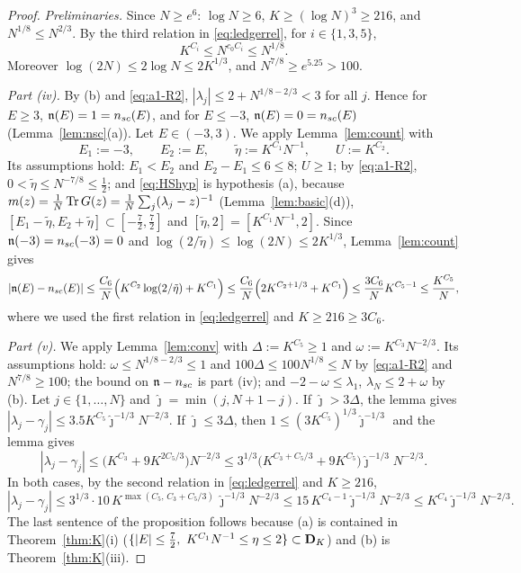 \begin{proof}
\emph{Preliminaries.} Since $N\ge e^6$: $\log N\ge6$, $K\ge(\log N)^3\ge216$, and $N^{1/8}\le N^{2/3}$. By the third relation in \eqref{eq:ledgerrel}, for $i\in\{1,3,5\}$,
\begin{equation}\tag{R2}\label{eq:a1-R2}
 K^{C_i}\le N^{c_0C_i}\le N^{1/8} .
\end{equation}
Moreover $\log(2N)\le2\log N\le2K^{1/3}$, and $N^{7/8}\ge e^{5.25}>100$.

\emph{Part \textup{(iv)}.} By (b) and \eqref{eq:a1-R2}, $|\lambda_j|\le2+N^{1/8-2/3}<3$ for all $j$. Hence for $E\ge3$, $\mathfrak{n}(E)=1=n_{sc}(E)$, and for $E\le-3$, $\mathfrak{n}(E)=0=n_{sc}(E)$ (Lemma~\ref{lem:nsc}(a)).
Let $E\in(-3,3)$. We apply Lemma~\ref{lem:count} with
\[
 E_1:=-3,\qquad E_2:=E,\qquad\tilde\eta:=K^{C_1}N^{-1},\qquad U:=K^{C_2}.
\]
Its assumptions hold: $E_1<E_2$ and $E_2-E_1\le6\le8$; $U\ge1$; by \eqref{eq:a1-R2}, $0<\tilde\eta\le N^{-7/8}\le\frac12$; and \eqref{eq:HShyp} is hypothesis (a), because $m(z)=\frac1N\operatorname{Tr} G(z)=\frac1N\sum_j(\lambda_j-z)^{-1}$ (Lemma~\ref{lem:basic}(d)),
$[E_1-\tilde\eta,E_2+\tilde\eta]\subset[-\frac72,\frac72]$ and $[\tilde\eta,2]=[K^{C_1}N^{-1},2]$. Since $\mathfrak{n}(-3)=n_{sc}(-3)=0$ and $\log(2/\tilde\eta)\le\log(2N)\le2K^{1/3}$, Lemma~\ref{lem:count} gives
\[
 |\mathfrak{n}(E)-n_{sc}(E)|\le\frac{C_6}N\Big(K^{C_2}\log(2/\tilde\eta)+K^{C_1}\Big)\le\frac{C_6}N\Big(2K^{C_2+1/3}+K^{C_1}\Big)\le\frac{3C_6}{N}K^{C_5-1}\le\frac{K^{C_5}}N,
\]
where we used the first relation in \eqref{eq:ledgerrel} and $K\ge216\ge3C_6$.

\emph{Part \textup{(v)}.} We apply Lemma~\ref{lem:conv} with $\Delta:=K^{C_5}\ge1$ and $\omega:=K^{C_3}N^{-2/3}$. Its assumptions hold: $\omega\le N^{1/8-2/3}\le1$ and $100\Delta\le100N^{1/8}\le N$ by \eqref{eq:a1-R2} and $N^{7/8}\ge100$;
the bound on $\mathfrak{n}-n_{sc}$ is part (iv); and $-2-\omega\le\lambda_1$, $\lambda_N\le2+\omega$ by (b). Let $j\in\{1,\dots,N\}$ and $\hat\jmath=\min(j,N+1-j)$. If $\hat\jmath>3\Delta$, the lemma gives
$|\lambda_j-\gamma_j|\le3.5K^{C_5}\hat\jmath^{-1/3}N^{-2/3}$. If $\hat\jmath\le3\Delta$, then $1\le(3K^{C_5})^{1/3}\hat\jmath^{-1/3}$ and the lemma gives
\[
 |\lambda_j-\gamma_j|\le\big(K^{C_3}+9K^{2C_5/3}\big)N^{-2/3}\le3^{1/3}\big(K^{C_3+C_5/3}+9K^{C_5}\big)\hat\jmath^{-1/3}N^{-2/3}.
\]
In both cases, by the second relation in \eqref{eq:ledgerrel} and $K\ge216$,
\[
 |\lambda_j-\gamma_j|\le3^{1/3}\cdot10\,K^{\max(C_5,\,C_3+C_5/3)}\,\hat\jmath^{-1/3}N^{-2/3}\le15\,K^{C_4-1}\hat\jmath^{-1/3}N^{-2/3}\le K^{C_4}\hat\jmath^{-1/3}N^{-2/3}.
\]
The last sentence of the proposition follows because (a) is contained in Theorem~\ref{thm:K}(i) ($\{|E|\le\frac72,\ K^{C_1}N^{-1}\le\eta\le2\}\subset\bD_K$) and (b) is Theorem~\ref{thm:K}(iii).
\end{proof}

